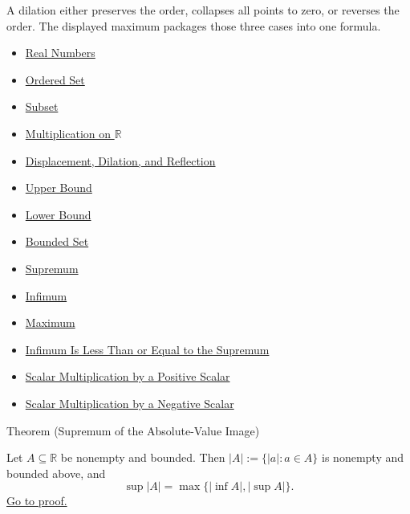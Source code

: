 \begin{remark*}[Interpretation]
A dilation either preserves the order, collapses all points to zero, or reverses the order. The displayed maximum packages those three cases into one formula.
\end{remark*}

\begin{dependencies}
\begin{itemize}
  \item \hyperref[def:reals]{Real Numbers}
  \item \hyperref[def:ordered-set]{Ordered Set}
  \item \hyperref[def:subset]{Subset}
  \item \hyperref[def:multiplication-on-r]{Multiplication on $\mathbb{R}$}
  \item \hyperref[def:displacement-dilation-reflection]{Displacement, Dilation, and Reflection}
  \item \hyperref[def:real-upper-bound]{Upper Bound}
  \item \hyperref[def:real-lower-bound]{Lower Bound}
  \item \hyperref[def:bounded]{Bounded Set}
  \item \hyperref[def:supremum]{Supremum}
  \item \hyperref[def:infimum]{Infimum}
  \item \hyperref[def:maximum]{Maximum}
  \item \hyperref[thm:infimum-less-than-supremum]{Infimum Is Less Than or Equal to the Supremum}
  \item \hyperref[thm:scalar-mult-positive]{Scalar Multiplication by a Positive Scalar}
  \item \hyperref[thm:scalar-mult-negative]{Scalar Multiplication by a Negative Scalar}
\end{itemize}
\end{dependencies}


\begin{theorembox}{Theorem (Supremum of the Absolute-Value Image)}
\begin{theorem}
\label{thm:supremum-absolute-value-image}
Let $A\subseteq\mathbb{R}$ be nonempty and bounded.  Then
$|A|:=\{|a|:a\in A\}$ is nonempty and bounded above, and
\[
  \sup |A|=\max\{|\inf A|,|\sup A|\}.
\]
\hyperref[prf:supremum-absolute-value-image]{Go to proof.}
\end{theorem}
\end{theorembox}

